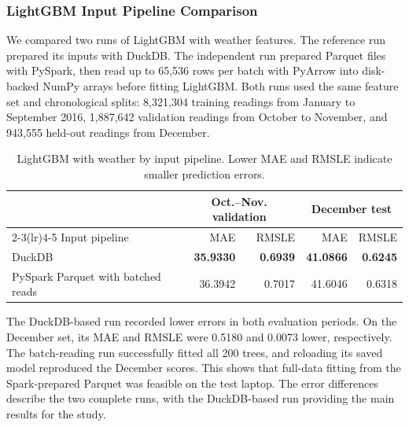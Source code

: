\subsubsection{LightGBM Input Pipeline Comparison}
\label{sec:lightgbm-input-pipeline-comparison}

We compared two runs of LightGBM with weather features. The reference run
prepared its inputs with DuckDB. The independent run prepared Parquet files with
PySpark, then read up to 65,536 rows per batch with PyArrow into disk-backed
NumPy arrays before fitting LightGBM. Both runs used the same feature set and
chronological splits: 8,321,304 training readings from January to September
2016, 1,887,642 validation readings from October to November, and 943,555
held-out readings from December.

\begin{table}[htbp]
    \centering
    \caption{LightGBM with weather by input pipeline. Lower MAE and RMSLE indicate smaller prediction errors.}
    \label{tab:lightgbm-input-pipeline-comparison}
    \begin{tabular}{lrrrr}
        \toprule
        & \multicolumn{2}{c}{Oct.--Nov. validation}
        & \multicolumn{2}{c}{December test} \\
        \cmidrule(lr){2-3}\cmidrule(lr){4-5}
        Input pipeline & MAE & RMSLE & MAE & RMSLE \\
        \midrule
        DuckDB & \textbf{35.9330} & \textbf{0.6939} & \textbf{41.0866} & \textbf{0.6245} \\
        PySpark Parquet with batched reads & 36.3942 & 0.7017 & 41.6046 & 0.6318 \\
        \bottomrule
    \end{tabular}
\end{table}

The DuckDB-based run recorded lower errors in both evaluation periods. On the
December set, its MAE and RMSLE were 0.5180 and 0.0073 lower, respectively.
The batch-reading run successfully fitted all 200 trees, and reloading its saved
model reproduced the December scores. This shows that full-data fitting from the
Spark-prepared Parquet was feasible on the test laptop. The error differences
describe the two complete runs, with the DuckDB-based run providing the main
results for the study.
